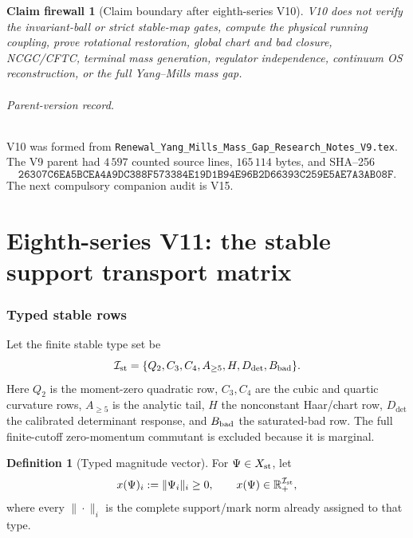 \documentclass[11pt,oneside]{book}
\newtheorem{firewall}[theorem]{Claim firewall}
\theoremstyle{definition}
\newtheorem{definition}[theorem]{Definition}
\theoremstyle{remark}
\begin{document}
\begin{firewall}[Claim boundary after eighth-series V10]
\label{fire:e8v10-claim}
V10 does not verify the invariant-ball or strict stable-map gates,
compute the physical running coupling, prove rotational restoration,
global chart and bad closure, NCGC/CFTC, terminal mass generation,
regulator independence, continuum OS reconstruction, or the full
Yang--Mills mass gap.
\end{firewall}

\paragraph{Parent-version record.}
V10 was formed from
\texttt{Renewal\_Yang\_Mills\_Mass\_Gap\_Research\_Notes\_V9.tex}.
The V9 parent had \(4\,597\) counted source lines,
\(165\,114\) bytes, and SHA--256
\[
\texttt{26307C6EA5BCEA4A9DC388F573384E19D1B94E96B2D66393C259E5AE7A3AB08F}.
\]
The next compulsory companion audit is V15.



\part{Eighth-series V11: the stable support transport matrix}
\label{part:e8v11}

\section{Typed stable rows}
\label{sec:e8v11-types}

Let the finite stable type set be
\[
 {\mathcal I}_{\rm st}
 =\{Q_2,C_3,C_4,A_{\ge5},H,D_{\det},B_{\rm bad}\}.   \label{eq:e8v11-types}
\]
Here \(Q_2\) is the moment-zero quadratic row, \(C_3,C_4\) are the
cubic and quartic curvature rows, \(A_{\ge5}\) is the analytic tail,
\(H\) the nonconstant Haar/chart row, \(D_{\det}\) the calibrated
determinant response, and \(B_{\rm bad}\) the saturated-bad row.  The
full finite-cutoff zero-momentum commutant is excluded because it is
marginal.

\begin{definition}[Typed magnitude vector]
\label{def:e8v11-vector}
For \(\Psi\in X_{\rm st}\), let
\[
 x(\Psi)_i:=\|\Psi_i\|_i\ge0,\qquad
 x(\Psi)\in\mathbb R_+^{{\mathcal I}_{\rm st}},      \label{eq:e8v11-x}
\]
where every \(\|\cdot\|_i\) is the complete support/mark norm already
assigned to that type.
\end{definition}
\end{document}

